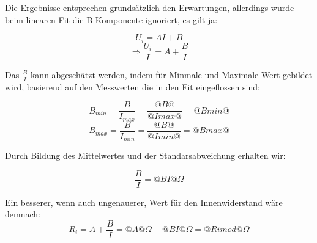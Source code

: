 \documentclass{article}
\begin{document}
Die Ergebnisse entsprechen grundsätzlich den Erwartungen, allerdings wurde beim linearen
Fit die B-Komponente ignoriert, es gilt ja:

$$U_i=AI+B$$
$$\Rightarrow \frac{U_i}{I}=A+\frac{B}{I}$$

Das $\frac{B}{I}$ kann abgeschätzt werden, indem für Minmale und Maximale
Wert gebildet wird, basierend auf den Messwerten die in den Fit eingeflossen sind:

$$B_{min}=\frac{B}{I_{max}}=\frac{@B@}{@Imax@}=@Bmin@$$
$$B_{max}=\frac{B}{I_{min}}=\frac{@B@}{@Imin@}=@Bmax@$$

Durch Bildung des Mittelwertes und der Standarsabweichung erhalten wir:

$$\frac{B}{I}=@BI@ \Omega$$

Ein besserer, wenn auch ungenauerer, Wert für den Innenwiderstand wäre demnach:
$$R_i=A+\frac{B}{I}=@A@\Omega+@BI@\Omega=@Rimod@\Omega$$


\end{document}
